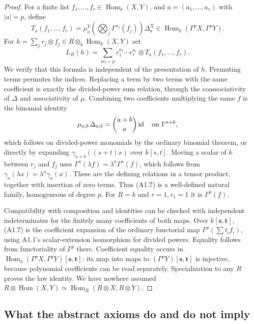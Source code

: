 \begin{proof}
For a finite list $f_1,\ldots,f_r\in\operatorname{Hom}_k(X,Y)$, and
$a=(a_1,\ldots,a_r)$ with $|a|=p$, define
\[
 T_a(f_1,\ldots,f_r)=
 \mu_a^Y\left(\bigotimes_j\Gamma^{a_j}(f_j)\right)\Delta_a^X
 \in\operatorname{Hom}_k(\Gamma^pX,\Gamma^pY).
\]
For $h=\sum_j r_j\otimes f_j\in R\otimes_k\operatorname{Hom}_k(X,Y)$
set
\[
 L_R(h)=\sum_{|a|=p}r_1^{a_1}\cdots r_r^{a_r}\otimes T_a(f_1,\ldots,f_r).
 \tag{A1.7}
\]
We verify that this formula is independent of the presentation of $h$.
Permuting terms permutes the indices. Replacing a term by two terms with
the same coefficient is exactly the divided-power sum relation, through
the coassociativity of $\Delta$ and associativity of $\mu$. Combining
two coefficients multiplying the same $f$ is the binomial identity
\[
 \mu_{a,b}\,\Delta_{a,b}=\binom{a+b}{a}\operatorname{id}
       \quad\hbox{on }\Gamma^{a+b},
\]
which follows on divided-power monomials by the ordinary binomial
theorem, or directly by expanding $\gamma_{a+b}((s+t)x)$ over
$k[s,t]$. Moving a scalar of $k$ between $r_j$ and $f_j$ uses
$\Gamma^a(\lambda f)=\lambda^a\Gamma^a(f)$, which follows from
$\gamma_a(\lambda x)=\lambda^a\gamma_a(x)$. These are the defining
relations in a tensor product, together with insertion of zero terms.
Thus (A1.7) is a well-defined natural family, homogeneous of degree $p$.
For $R=k$ and $r=1,r_1=1$ it is $\Gamma^p(f)$.

Compatibility with composition and identities can be checked with
independent indeterminates for the finitely many coefficients of both
maps. Over $k[\mathbf s,\mathbf t]$, (A1.7) is the coefficient expansion
of the ordinary functorial map $\Gamma^p(\sum t_i f_i)$, using A1.1's
scalar-extension isomorphism for divided powers. Equality follows from
functoriality of $\Gamma^p$ there. Coefficient equality occurs in
$\operatorname{Hom}_k(\Gamma^pX,\Gamma^pY)[\mathbf s,\mathbf t]$:
its map into maps to $(\Gamma^pY)[\mathbf s,\mathbf t]$ is injective,
because polynomial coefficients can be read separately. Specialization
to any $R$ proves the law identity. We have nowhere assumed
$R\otimes\operatorname{Hom}(X,Y)\simeq
\operatorname{Hom}_R(R\otimes X,R\otimes Y)$.
\end{proof}

\subsection{What the abstract axioms do and do not imply}

